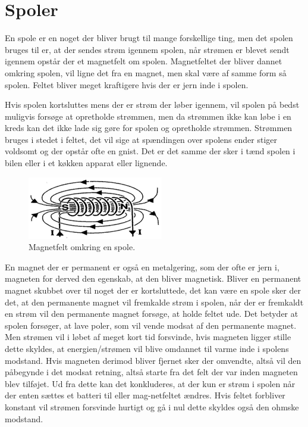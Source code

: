 \section{Spoler}

En spole er en noget der bliver brugt til mange forskellige ting, men det spolen bruges til er, at der sendes strøm igennem spolen, når strømen er blevet sendt igennem opstår der et magnetfelt om spolen. Magnetfeltet der bliver dannet omkring spolen, vil ligne det fra en magnet, men skal være af samme form så spolen. Feltet bliver meget kraftigere hvis der er jern inde i spolen. 

Hvis spolen kortsluttes mens der er strøm der løber igennem, vil spolen på bedst muligvis forsøge at opretholde strømmen, men da strømmen ikke kan løbe i en kreds kan det ikke lade sig gøre for spolen og opretholde strømmen.  Strømmen bruges i stedet i feltet, det vil sige at spændingen over spolens ender stiger voldsomt og der opstår ofte en gnist. Det er det samme der sker i tænd spolen i bilen eller i et køkken apparat eller lignende.

\begin{figure}[htbp]
	\centering
	\includegraphics[width=0.5
	\textwidth]{Vildledning/Schematics/magnetfelt_omkring_en_spole.png}
	\caption{Magnetfelt omkring en spole.\cite{spoler}}
	\label{spole1}
\end{figure}

En magnet der er permanent er også en metalgering, som der ofte er jern i, magneten for derved den egenskab, at den bliver magnetisk.  Bliver en permanent magnet skubbet over til noget der er kortsluttede, det kan være en spole sker der det, at den permanente magnet vil fremkalde strøm i spolen, når der er fremkaldt en strøm vil den permanente magnet forsøge, at holde feltet ude. Det betyder at spolen forsøger, at lave poler, som vil vende modsat af den permanente magnet. Men strømen vil i løbet af meget kort tid forsvinde, hvis magneten ligger stille dette skyldes, at energien/strømen vil blive omdannet til varme inde i spolens modstand. Hvis magneten derimod bliver fjernet sker der omvendte, altså vil den påbegynde i det modsat retning, altså starte fra det felt der var inden magneten blev tilføjet. Ud fra dette kan det konkluderes, at der kun er strøm i spolen når der enten sættes et batteri til eller mag-netfeltet ændres. Hvis feltet forbliver konstant vil strømen forsvinde hurtigt og gå i nul dette skyldes også den ohmske modstand. 


